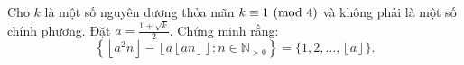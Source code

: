 \ifshowproblem
\begin{problem}\label{example:ROU-2015-TST-D1-P4}
    Cho \( k \) là một số nguyên dương thỏa mãn \( k \equiv 1 \ (\mathrm{mod}\ 4) \) và không phải là một số chính phương. 
    Đặt \( a = \frac{1 + \sqrt{k}}{2} \).  
    Chứng minh rằng:
    \[
        \left\{ \left\lfloor a^2n \right\rfloor - \left\lfloor a\left\lfloor an \right\rfloor \right\rfloor : n \in \mathbb{N}_{>0} \right\} = \{1, 2, \ldots, \left\lfloor a \right\rfloor\}.
    \]
\end{problem}
\fi

\footnotemark
{}
\fi
